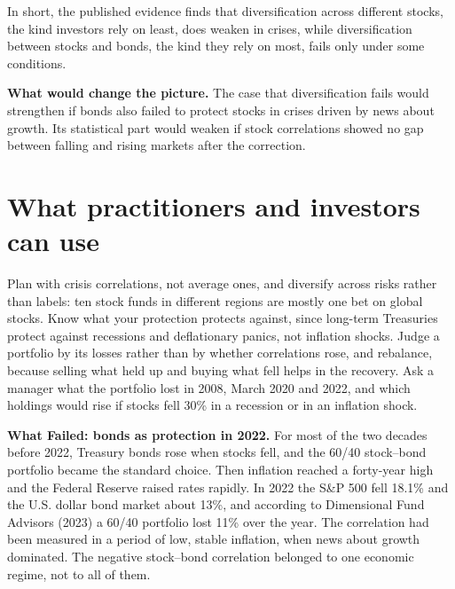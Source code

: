 In short, the published evidence finds that diversification across different stocks, the kind investors rely on least, does weaken in crises, while diversification between stocks and bonds, the kind they rely on most, fails only under some conditions.

\textbf{What would change the picture.} The case that diversification fails would strengthen if bonds also failed to protect stocks in crises driven by news about growth. Its statistical part would weaken if stock correlations showed no gap between falling and rising markets after the correction.

\section{What practitioners and investors can use}
\label{sec:13-investors}

Plan with crisis correlations, not average ones, and diversify across risks rather than labels: ten stock funds in different regions are mostly one bet on global stocks. Know what your protection protects against, since long-term Treasuries protect against recessions and deflationary panics, not inflation shocks. Judge a portfolio by its losses rather than by whether correlations rose, and rebalance, because selling what held up and buying what fell helps in the recovery. Ask a manager what the portfolio lost in 2008, March 2020 and 2022, and which holdings would rise if stocks fell 30\% in a recession or in an inflation shock.

\begin{callout}
\textbf{What Failed: bonds as protection in 2022.} For most of the two decades before 2022, Treasury bonds rose when stocks fell, and the 60/40 stock--bond portfolio became the standard choice. Then inflation reached a forty-year high and the Federal Reserve raised rates rapidly. In 2022 the S\&P 500 fell 18.1\% and the U.S. dollar bond market about 13\%, and according to Dimensional Fund Advisors (2023) a 60/40 portfolio lost 11\% over the year. The correlation had been measured in a period of low, stable inflation, when news about growth dominated. The negative stock--bond correlation belonged to one economic regime, not to all of them.
\end{callout}

\makeatletter
{}
\makeatother


